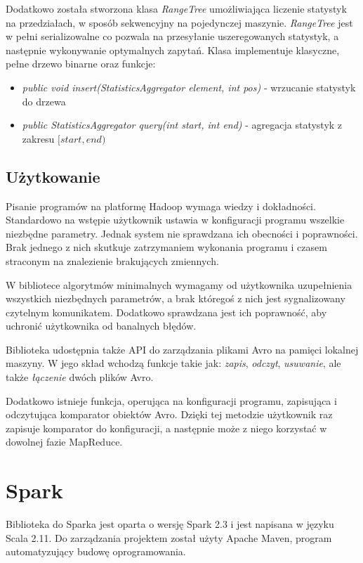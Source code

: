 \documentclass[licencjacka]{pracamgr}
\begin{document}
Dodatkowo została stworzona klasa \textit{RangeTree} umożliwiająca liczenie statystyk na przedziałach, w sposób sekwencyjny na pojedynczej maszynie. \textit{RangeTree} jest w pełni serializowalne co pozwala na przesyłanie uszeregowanych statystyk, a następnie wykonywanie optymalnych zapytań. Klasa implementuje klasyczne, pełne drzewo binarne oraz funkcje:
\begin{itemize}
    \item \textit{public void insert(StatisticsAggregator element, int pos)} - wrzucanie statystyk do drzewa
    \item \textit{public StatisticsAggregator query(int start, int end)} - agregacja statystyk z zakresu \([start, end)\)
\end{itemize}

\subsection{Użytkowanie}

Pisanie programów na platformę Hadoop wymaga wiedzy i dokładności. Standardowo na wstępie użytkownik ustawia w konfiguracji programu wszelkie niezbędne parametry. Jednak system nie sprawdzana ich obecności i poprawności. Brak jednego z nich skutkuje zatrzymaniem wykonania programu i czasem straconym na znalezienie brakujących zmiennych.

W bibliotece algorytmów minimalnych wymagamy od użytkownika uzupełnienia wszystkich niezbędnych parametrów, a brak któregoś z nich jest sygnalizowany czytelnym komunikatem. Dodatkowo sprawdzana jest ich poprawność, aby uchronić użytkownika od banalnych błędów.

Biblioteka udostępnia także API do zarządzania plikami Avro na pamięci lokalnej maszyny. W jego skład wchodzą funkcje takie jak: \textit{zapis}, \textit{odczyt}, \textit{usuwanie}, ale także \textit{łączenie} dwóch plików Avro.

Dodatkowo istnieje funkcja, operująca na konfiguracji programu, zapisująca i odczytująca komparator obiektów Avro. Dzięki tej metodzie użytkownik raz zapisuje komparator do konfiguracji, a następnie może z niego korzystać w dowolnej fazie MapReduce.

\section{Spark}

Biblioteka do Sparka jest oparta o wersję Spark 2.3 i jest napisana w języku Scala 2.11. Do zarządzania projektem został użyty Apache Maven, program automatyzujący budowę oprogramowania.
\end{document}
